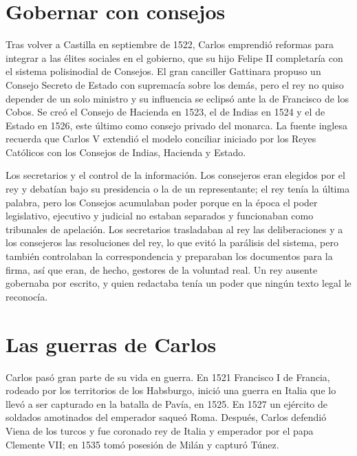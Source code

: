 \documentclass{book}
\begin{document}
\section{Gobernar con consejos}

Tras volver a Castilla en septiembre de 1522, Carlos emprendió reformas para integrar a las élites sociales en el gobierno, que su hijo Felipe II completaría con el sistema polisinodial de Consejos. El gran canciller Gattinara propuso un Consejo Secreto de Estado con supremacía sobre los demás, pero el rey no quiso depender de un solo ministro y su influencia se eclipsó ante la de Francisco de los Cobos. Se creó el Consejo de Hacienda en 1523, el de Indias en 1524 y el de Estado en 1526, este último como consejo privado del monarca. La fuente inglesa recuerda que Carlos V extendió el modelo conciliar iniciado por los Reyes Católicos con los Consejos de Indias, Hacienda y Estado.


Los secretarios y el control de la información. Los consejeros eran elegidos por el rey y debatían bajo su presidencia o la de un representante; el rey tenía la última palabra, pero los Consejos acumulaban poder porque en la época el poder legislativo, ejecutivo y judicial no estaban separados y funcionaban como tribunales de apelación. Los secretarios trasladaban al rey las deliberaciones y a los consejeros las resoluciones del rey, lo que evitó la parálisis del sistema, pero también controlaban la correspondencia y preparaban los documentos para la firma, así que eran, de hecho, gestores de la voluntad real. Un rey ausente gobernaba por escrito, y quien redactaba tenía un poder que ningún texto legal le reconocía.


\section{Las guerras de Carlos}

Carlos pasó gran parte de su vida en guerra. En 1521 Francisco I de Francia, rodeado por los territorios de los Habsburgo, inició una guerra en Italia que lo llevó a ser capturado en la batalla de Pavía, en 1525. En 1527 un ejército de soldados amotinados del emperador saqueó Roma. Después, Carlos defendió Viena de los turcos y fue coronado rey de Italia y emperador por el papa Clemente VII; en 1535 tomó posesión de Milán y capturó Túnez.
\end{document}
